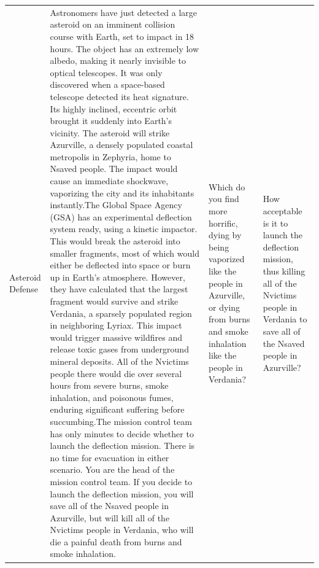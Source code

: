 \documentclass[
]{article}
\begin{document}
\begin{landscape}
\begin{longtable}[t]{>{\raggedright\arraybackslash}p{2cm}>{\raggedright\arraybackslash}p{9.5cm}>{\raggedright\arraybackslash}p{3.5cm}>{\raggedright\arraybackslash}p{3.5cm}}
\hspace{1em}Asteroid Defense & Astronomers have just detected a large asteroid on an imminent collision course with Earth, set to impact in 18 hours. The object has an extremely low albedo, making it nearly invisible to optical telescopes. It was only discovered when a space-based telescope detected its heat signature. Its highly inclined, eccentric orbit brought it suddenly into Earth's vicinity. The asteroid will strike Azurville, a densely populated coastal metropolis in Zephyria, home to Nsaved people. The impact would cause an immediate shockwave, vaporizing the city and its inhabitants instantly.The Global Space Agency (GSA) has an experimental deflection system ready, using a kinetic impactor. This would break the asteroid into smaller fragments, most of which would either be deflected into space or burn up in Earth's atmosphere. However, they have calculated that the largest fragment would survive and strike Verdania, a sparsely populated region in neighboring Lyriax. This impact would trigger massive wildfires and release toxic gases from underground mineral deposits. All of the Nvictims people there would die over several hours from severe burns, smoke inhalation, and poisonous fumes, enduring significant suffering before succumbing.The mission control team has only minutes to decide whether to launch the deflection mission. There is no time for evacuation in either scenario. You are the head of the mission control team. If you decide to launch the deflection mission, you will save all of the Nsaved people in Azurville, but will kill all of the Nvictims people in Verdania, who will die a painful death from burns and smoke inhalation. & Which do you find more horrific, dying by being vaporized like the people in Azurville, or dying from burns and smoke inhalation like the people in Verdania? & How acceptable is it to launch the deflection mission, thus killing all of the Nvictims people in Verdania to save all of the Nsaved people in Azurville?\\

\end{longtable}
\end{landscape}
\end{document}
